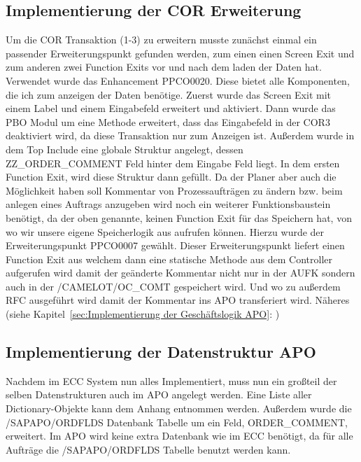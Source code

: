 \subsection{Implementierung der COR Erweiterung}
\label{sec:Implementierung der COR Erweiterung}   
Um die COR Transaktion (1-3) zu erweitern musste zunächst einmal ein passender Erweiterungspunkt gefunden werden, zum einen einen Screen Exit und zum anderen zwei Function Exits vor und nach dem laden der Daten hat. Verwendet wurde das Enhancement PPCO0020. Diese bietet alle Komponenten, die ich zum anzeigen der Daten benötige. Zuerst wurde das Screen Exit mit einem Label und einem Eingabefeld erweitert und aktiviert. Dann wurde das \ac*{PBO} Modul um eine Methode erweitert, dass das Eingabefeld in der COR3 deaktiviert wird, da diese Transaktion nur zum Anzeigen ist. Außerdem wurde in dem Top Include eine globale Struktur angelegt, dessen ZZ\_ORDER\_COMMENT Feld hinter dem Eingabe Feld liegt. In dem ersten Function Exit, wird diese Struktur dann gefüllt. Da der Planer aber auch die Möglichkeit haben soll Kommentar von Prozessaufträgen zu ändern bzw. beim anlegen eines Auftrags anzugeben wird noch ein weiterer Funktionsbaustein benötigt, da der oben genannte, keinen Function Exit für das Speichern hat, von wo wir unsere eigene Speicherlogik aus aufrufen können. Hierzu wurde der Erweiterungspunkt PPCO0007 gewählt. Dieser Erweiterungspunkt liefert einen Function Exit aus welchem dann eine statische Methode aus dem Controller aufgerufen wird damit der geänderte Kommentar nicht nur in der AUFK sondern auch in der /CAMELOT/OC\_COMT gespeichert wird. Und wo zu außerdem \ac*{RFC} ausgeführt wird damit der Kommentar ins \ac*{APO} transferiert wird. Näheres (siehe Kapitel~\ref{sec:Implementierung der Geschäftslogik APO}: )

\subsection{Implementierung der Datenstruktur APO}
\label{sec:Implementierung der Datenstruktur APO} 
Nachdem im \ac*{ECC} System nun alles Implementiert, muss nun ein großteil der selben Datenstrukturen auch im \ac*{APO} angelegt werden. Eine Liste aller Dictionary-Objekte kann dem Anhang entnommen werden. Außerdem wurde die /SAPAPO/ORDFLDS Datenbank Tabelle um ein Feld, ORDER\_COMMENT, erweitert. Im \ac*{APO} wird keine extra Datenbank wie im \ac*{ECC} benötigt, da für alle Aufträge die /SAPAPO/ORDFLDS Tabelle benutzt werden kann.

